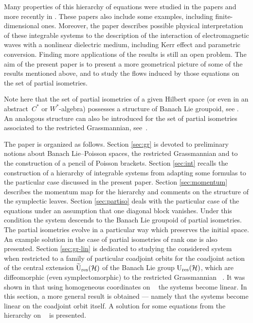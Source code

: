 \documentclass[pdftex]{sigma}
\theoremstyle{definition}
\numberwithin{equation}{section}
\renewcommand{\H}{\mathcal{H}}
\DeclareMathOperator{\Gr}{Gr_{res}(\H,\H_+)}
\newcommand{\Ur}{\mathrm{U}_{\textnormal{res}}(\H)}
\newcommand{\Urt}{\widetilde{\mathrm{U}}_{\textnormal{res}}(\H)}
\begin{document}
Many properties of this hierarchy of equations were studied in the papers \cite{GO-grass-bial,GO-grass,GO-grass2} and more recently in \cite{GT-partiso-bial}. These papers also include some examples, including finite-dimensional ones. Moreover, the paper \cite{GO-grass2} describes possible physical interpretation of these integrable systems to the description of the interaction of electromagnetic waves with a nonlinear dielectric medium, including Kerr effect and parametric conversion. Finding more applications of the results is still an open problem. The aim of the present paper is to present a more geometrical picture of some of the results mentioned above, and to study the flows induced by those equations on the set of partial isometries.

Note here that the set of partial isometries of a given Hilbert space (or even in an abstract~$C^*$ or $W^*$-algebra) possesses a structure of Banach Lie groupoid, see \cite{BGJP,OS}. An analogous structure can also be introduced for the set of partial isometries associated to the restricted Grassmannian, see~\cite{GJS-partiso}.

The paper is organized as follows. Section \ref{sec:gr} is devoted to preliminary notions about Banach Lie--Poisson spaces, the restricted Grassmannian and to the construction of a pencil of Poisson brackets. Section \ref{sec:int} recalls the construction of a hierarchy of integrable systems from \cite{GO-grass} adapting some formulas to the particular case discussed in the present paper.
Section \ref{sec:momentum} describes the momentum map for the hierarchy and comments on the structure of the symplectic leaves.
Section \ref{sec:partiso} deals with the particular case of the equations under an assumption that one diagonal block vanishes. Under this condition the system descends to the Banach Lie groupoid of partial isometries. The partial isometries evolve in a particular way which preserves the initial space. An example solution in the case of partial isometries of rank one is also presented.
Section \ref{sec:gr-lin} is dedicated to studying the considered system when restricted to a family of particular coadjoint orbits for the coadjoint action of the central extension $\Urt$ of the Banach Lie group $\Ur$, which are diffeomorphic (even symplectomorphic) to the restricted Grassmannian $\Gr$. It was shown in \cite{GO-grass} that using homogeneous coordinates on $\Gr$ the systems become linear. In this section, a more general result is obtained --- namely that the systems become linear on the coadjoint orbit itself. A solution for some equations from the hierarchy on $\Gr$ is presented.
\end{document}
